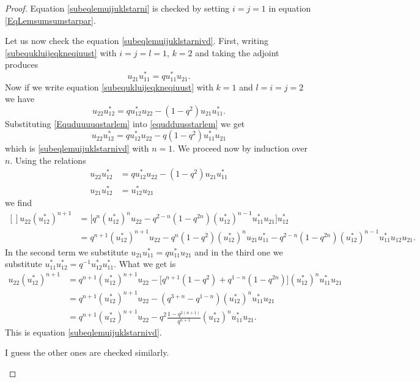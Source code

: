 \begin{proof}
	Equation \eqref{subeqlemuijuklstarni} is checked by setting \( i=j=1\) in equation \eqref{EqLemsumsumstarpar}.

	Let us now check the equation \eqref{subeqlemuijuklstarnivd}. First, writing \eqref{subequkluijeqkneqiuust} with \( i=j=l=1\), \( k=2\)  and taking the adjoint produces
	\begin{equation}        \label{Equduuuuqstarlem}
		u_{21}u_{11}^*=qu_{11}^*u_{21}.
	\end{equation}
	Now if we write equation \eqref{subequkluijeqkneqiuust} with \( k=1\) and \( l=i=j=2\) we have
	\begin{equation}        \label{equdduusstarlem}
		u_{22}u_{12}^*=qu_{12}^*u_{22}-(1-q^2)u_{21}u_{11}^*.
	\end{equation}
	Substituting \eqref{Equduuuuqstarlem} into \eqref{equdduusstarlem} we get
	\begin{equation}
		u_{22}u_{12}^*=qu_{12}^*u_{22}-q(1-q^2)u_{11}^*u_{21}
	\end{equation}
	which is \eqref{subeqlemuijuklstarnivd} with \( n=1\). We proceed now by induction over \( n\). Using the relations
	\begin{subequations}
		\begin{align}
			u_{22}u_{12}^* & =qu_{12}^*u_{22}-(1-q^2)u_{21}u_{11}^* \\
			u_{21}u_{12}^* & =u_{12}^*u_{21}
		\end{align}
	\end{subequations}
	we find
	\begin{equation}
		\begin{aligned}[]
			u_{22}(u_{12}^*)^{n+1} & =\big[ q^n(u_{12}^*)^nu_{22}-q^{2-n}(1-q^{2n})(u_{12}^*)^{n-1}u_{11}^*u_{21} \big]u_{12}^*                                 \\
			                       & =q^{n+1}(u_{12}^*)^{n+1}u_{22}-q^n(1-q^2)(u_{12}^*)^nu_{21}u_{11}^*-q^{2-n}(1-q^{2n})(u_{12}^*)^{n-1}u_{11}^*u_{12}u_{21}.
		\end{aligned}
	\end{equation}
	In the second term we substitute \( u_{21}u_{11}^*=qu_{11}^*u_{21}\) and in the third one we substitute \( u_{11}^*u_{12}^*=q^{-1}u_{12}^*u_{11}^*\). What we get is
	\begin{subequations}
		\begin{align}
			u_{22}(u_{12}^*)^{n+1} & =q^{n+1}(u_{12}^*)^{n+1}u_{22}-\big[ q^{n+1}(1-q^2)+q^{1-n}(1-q^{2n}) \big](u_{12}^*)^nu_{11}^*u_{21} \\
			                       & =q^{n+1}(u_{12}^*)^{n+1}u_{22}-(q^{3+n}-q^{1-n})(u_{12}^*)^nu_{11}^*u_{21}                            \\
			                       & =q^{n+1}(u_{12}^*)^{n+1}u_{22}-q^2\frac{ 1-q^{2(n+1)} }{ q^{n+1} }(u_{12}^*)^nu_{11}^*u_{21}.
		\end{align}
	\end{subequations}
	This is equation \eqref{subeqlemuijuklstarnivd}.

	\begin{probleme}
		I guess the other ones are checked similarly.
	\end{probleme}
\end{proof}

